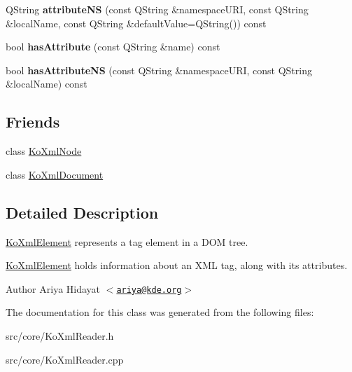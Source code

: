 \begin{DoxyCompactItemize}
\item 
\hypertarget{classKoXmlElement_ada688c66b5cd1cecf0711de63fe8f347}{
QString {\bfseries attributeNS} (const QString \&namespaceURI, const QString \&localName, const QString \&defaultValue=QString()) const }
\label{classKoXmlElement_ada688c66b5cd1cecf0711de63fe8f347}

\item 
\hypertarget{classKoXmlElement_a2a4784923c11d9d33ce187b55c562601}{
bool {\bfseries hasAttribute} (const QString \&name) const }
\label{classKoXmlElement_a2a4784923c11d9d33ce187b55c562601}

\item 
\hypertarget{classKoXmlElement_a8879ebfc276ad89f9de6aa3dab5b063d}{
bool {\bfseries hasAttributeNS} (const QString \&namespaceURI, const QString \&localName) const }
\label{classKoXmlElement_a8879ebfc276ad89f9de6aa3dab5b063d}

\end{DoxyCompactItemize}
\subsection*{Friends}
\begin{DoxyCompactItemize}
\item 
\hypertarget{classKoXmlElement_a6c97883f92c7cbf2ecdf17db6cea8297}{
class \hyperlink{classKoXmlElement_a6c97883f92c7cbf2ecdf17db6cea8297}{KoXmlNode}}
\label{classKoXmlElement_a6c97883f92c7cbf2ecdf17db6cea8297}

\item 
\hypertarget{classKoXmlElement_a7f0a67ef52ddc6542737225a82e4f487}{
class \hyperlink{classKoXmlElement_a7f0a67ef52ddc6542737225a82e4f487}{KoXmlDocument}}
\label{classKoXmlElement_a7f0a67ef52ddc6542737225a82e4f487}

\end{DoxyCompactItemize}


\subsection{Detailed Description}
\hyperlink{classKoXmlElement}{KoXmlElement} represents a tag element in a DOM tree.

\hyperlink{classKoXmlElement}{KoXmlElement} holds information about an XML tag, along with its attributes.

\begin{DoxyAuthor}{Author}
Ariya Hidayat $<$\href{mailto:ariya@kde.org}{\tt ariya@kde.org}$>$ 
\end{DoxyAuthor}


The documentation for this class was generated from the following files:\begin{DoxyCompactItemize}
\item 
src/core/KoXmlReader.h\item 
src/core/KoXmlReader.cpp\end{DoxyCompactItemize}
